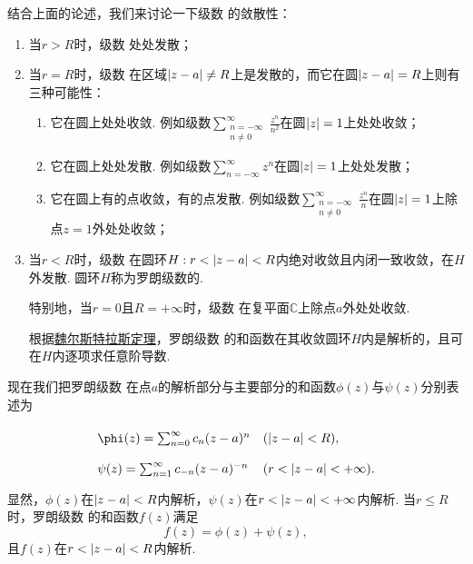 结合上面的论述，我们来讨论一下级数  的敛散性：
\begin{enumerate}
\item 当\(r > R\)时，级数  处处发散；

\item 当\(r = R\)时，级数  在区域\(\abs{z-a} \neq R\)上是发散的，而它在圆\(\abs{z-a}=R\)上则有三种可能性：\begin{enumerate}
\item 它在圆上处处收敛.
例如级数\(\sum_{\substack{n=-\infty \\ n\neq0}}^\infty \frac{z^n}{n^2}\)在圆\(\abs{z}=1\)上处处收敛；

\item 它在圆上处处发散.
例如级数\(\sum_{n=-\infty}^\infty z^n\)在圆\(\abs{z}=1\)上处处发散；

\item 它在圆上有的点收敛，有的点发散.
例如级数\(\sum_{\substack{n=-\infty \\ n\neq0}}^\infty \frac{z^n}{n}\)在圆\(\abs{z}=1\)上除点\(z=1\)外处处收敛；
\end{enumerate}

\item 当\(r < R\)时，级数  在圆环\(H: r < \abs{z-a} < R\)内绝对收敛且内闭一致收敛，在\(H\)外发散.
圆环\(H\)称为罗朗级数的.

特别地，当\(r = 0\)且\(R = +\infty\)时，级数  在复平面\(\mathbb{C}\)上除点\(a\)外处处收敛.

根据\hyperref[theorem:解析函数的级数表示.魏尔斯特拉斯定理]{魏尔斯特拉斯定理}，罗朗级数  的和函数在其收敛圆环\(H\)内是解析的，且可在\(H\)内逐项求任意阶导数.
\end{enumerate}

现在我们把罗朗级数  在点\(a\)的解析部分与主要部分的和函数\(\phi(z)\)与\(\psi(z)\)分别表述为\[
\def\arraystretch{2}
\begin{array}{ll}
\phi(z) = \sum_{n=0}^\infty c_n (z-a)^n & (\abs{z-a}<R), \\
\psi(z) = \sum_{n=1}^\infty c_{-n} (z-a)^{-n} & (r < \abs{z-a} < +\infty).
\end{array}
\]显然，\(\phi(z)\)在\(\abs{z-a}<R\)内解析，\(\psi(z)\)在\(r<\abs{z-a}<+\infty\)内解析.
当\(r \leq R\)时，罗朗级数  的和函数\(f(z)\)满足\[
f(z) = \phi(z) + \psi(z),
\]且\(f(z)\)在\(r<\abs{z-a}<R\)内解析.

